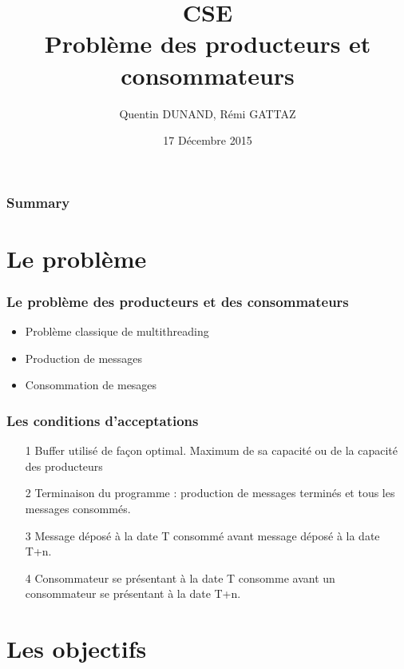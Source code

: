 \documentclass{beamer}
\title[CSE-ProdCons]{CSE\\Problème des producteurs et consommateurs}
\subtitle{}
\author{Quentin DUNAND, Rémi GATTAZ}
\date{17 Décembre 2015}
\begin{document}
    \frame{
        \titlepage
    }

    \begin{frame}
        \frametitle{Summary}
        \setcounter{tocdepth}{1}
        \tableofcontents
    \end{frame}

    \section{Le problème}

    \begin{frame}
        \frametitle{Le problème des producteurs et des consommateurs}

        \begin{itemize}
            \item Problème classique de multithreading
            \item[ ]
            \item Production de messages
            \item[ ]
            \item Consommation de mesages
        \end{itemize}
    \end{frame}

    \begin{frame}
        \frametitle{Les conditions d'acceptations}

        \begin{itemize}
            \item[1] Buffer utilisé de façon optimal. Maximum de sa capacité ou de la capacité des producteurs
            \item[2] Terminaison du programme : production de messages terminés et tous les messages consommés.
            \item[3] Message déposé à la date T consommé avant message déposé à la date T+n.
            \item[4] Consommateur se présentant à la date T consomme avant un consommateur se présentant à la date T+n.
        \end{itemize}
    \end{frame}

    \section{Les objectifs}
\end{document}
